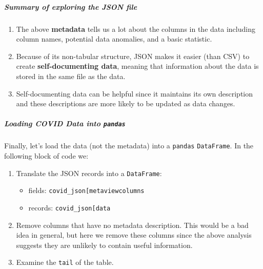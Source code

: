 \documentclass[
  letterpaper,
  DIV=11,
  numbers=noendperiod]{scrreprt}
\let\oldsubparagraph\subparagraph
\renewcommand{\subparagraph}[1]{\oldsubparagraph{#1}\mbox{}}
\providecommand{\tightlist}{%
  \setlength{\itemsep}{0pt}\setlength{\parskip}{0pt}}\usepackage{longtable,booktabs,array}
\begin{document}
\hypertarget{summary-of-exploring-the-json-file}{%
\subparagraph{Summary of exploring the JSON
file}\label{summary-of-exploring-the-json-file}}

\begin{enumerate}
\def\labelenumi{\arabic{enumi}.}
\tightlist
\item
  The above \textbf{metadata} tells us a lot about the columns in the
  data including column names, potential data anomalies, and a basic
  statistic.
\item
  Because of its non-tabular structure, JSON makes it easier (than CSV)
  to create \textbf{self-documenting data}, meaning that information
  about the data is stored in the same file as the data.
\item
  Self-documenting data can be helpful since it maintains its own
  description and these descriptions are more likely to be updated as
  data changes.
\end{enumerate}

\hypertarget{loading-covid-data-into-pandas}{%
\subparagraph{\texorpdfstring{Loading COVID Data into
\texttt{pandas}}{Loading COVID Data into pandas}}\label{loading-covid-data-into-pandas}}

Finally, let's load the data (not the metadata) into a \texttt{pandas}
\texttt{DataFrame}. In the following block of code we:

\begin{enumerate}
\def\labelenumi{\arabic{enumi}.}
\item
  Translate the JSON records into a \texttt{DataFrame}:

  \begin{itemize}
  \tightlist
  \item
    fields:
    \texttt{covid\_json{[}\textquotesingle{}meta\textquotesingle{}{]}{[}\textquotesingle{}view\textquotesingle{}{]}{[}\textquotesingle{}columns\textquotesingle{}{]}}
  \item
    records:
    \texttt{covid\_json{[}\textquotesingle{}data\textquotesingle{}{]}}
  \end{itemize}
\item
  Remove columns that have no metadata description. This would be a bad
  idea in general, but here we remove these columns since the above
  analysis suggests they are unlikely to contain useful information.
\item
  Examine the \texttt{tail} of the table.
\end{enumerate}
\end{document}
